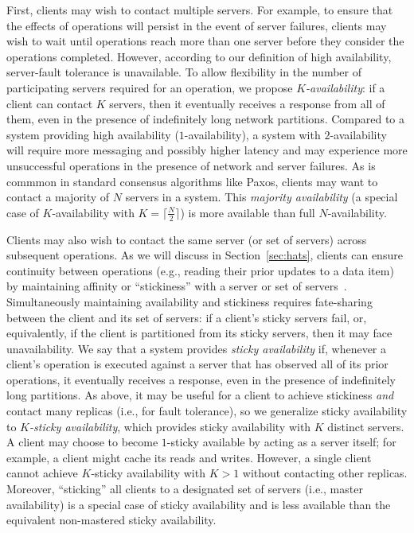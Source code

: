 First, clients may wish to contact multiple servers. For example, to
ensure that the effects of operations will persist in the event of
server failures, clients may wish to wait until operations reach more
than one server before they consider the operations
completed. However, according to our definition of high availability,
server-fault tolerance is unavailable. To allow flexibility in the
number of participating servers required for an operation, we propose
\textit{$K$-availability}: if a client can contact $K$ servers, then
it eventually receives a response from all of them, even in the
presence of indefinitely long network partitions. Compared to a system
providing high availability ($1$-availability), a system with
$2$-availability will require more messaging and possibly higher
latency and may experience more unsuccessful operations in the
presence of network and server failures.  As is commmon in standard
consensus algorithms like Paxos, clients may want to contact a
majority of $N$ servers in a system. This \textit{majority
  availability} (a special case of $K$-availability with $K=\lceil
\frac{N}{2} \rceil$) is more available than full $N$-availability.

Clients may also wish to contact the same server (or set of servers)
across subsequent operations. As we will discuss in
Section~\ref{sec:hats}, clients can ensure continuity between
operations (e.g., reading their prior updates to a data item) by
maintaining affinity or ``stickiness'' with a server or set of
servers~\cite{vogels-defs}. Simultaneously maintaining availability
and stickiness requires fate-sharing between the client and its set of
servers: if a client's sticky servers fail, or, equivalently, if the
client is partitioned from its sticky servers, then it may face
unavailability. We say that a system provides \textit{sticky
  availability} if, whenever a client's operation is executed against
a server that has observed all of its prior operations, it eventually
receives a response, even in the presence of indefinitely long
partitions. As above, it may be useful for a client to achieve
stickiness \textit{and} contact many replicas (i.e., for fault
tolerance), so we generalize sticky availability to \textit{$K$-sticky
  availability}, which provides sticky availability with $K$ distinct
servers. A client may choose to become $1$-sticky available by acting
as a server itself; for example, a client might cache its reads and
writes. However, a single client cannot achieve $K$-sticky
availability with $K>1$ without contacting other replicas. Moreover, ``sticking'' all clients
to a designated set of servers (i.e., master availability) is a
special case of sticky availability and is less available than the
equivalent non-mastered sticky availability.

